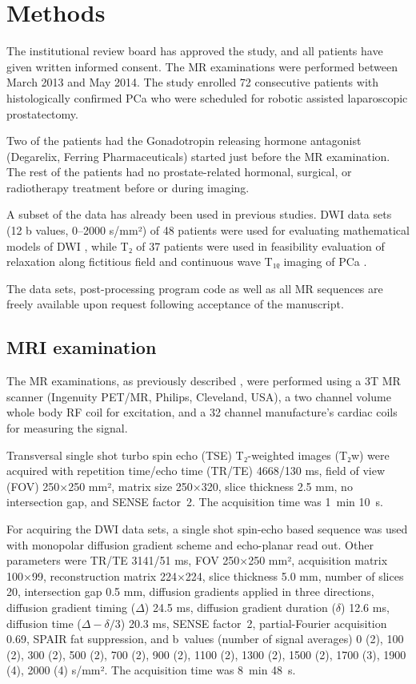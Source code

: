\section{Methods}

The institutional review board has approved the study, and all patients have
given written informed consent. The MR examinations were performed between March
2013 and May 2014. The study enrolled 72 consecutive patients with
histologically confirmed PCa who were scheduled for robotic assisted
laparoscopic prostatectomy.

Two of the patients had the Gonadotropin releasing hormone antagonist
(Degarelix, Ferring Pharmaceuticals) started just before the MR examination. The
rest of the patients had no prostate-related hormonal, surgical, or radiotherapy
treatment before or during imaging.

A subset of the data has already been used in previous studies. DWI data sets
(12 b values, 0--2000 s/mm²) of 48 patients were used for evaluating
mathematical models of DWI \citep{Toivonen2015, Jambor2015Relaxation,
Jambor2015Evaluation}, while T₂ of 37 patients were used in feasibility
evaluation of relaxation along fictitious field and continuous wave T₁ᵨ imaging
of PCa \citep{Jambor2015Relaxation, Jambor2015Rotating}.

The data sets, post-processing program code as well as all MR sequences are
freely available upon request following acceptance of the manuscript.


\subsection{MRI examination}

The MR examinations, as previously described \citep{Jambor2015Evaluation,
Toivonen2015, Jambor2015Relaxation}, were performed using a 3T MR scanner
(Ingenuity PET/MR, Philips, Cleveland, USA), a two channel volume whole body RF
coil for excitation, and a 32 channel manufacture's cardiac coils for measuring
the signal.

Transversal single shot turbo spin echo (TSE) T₂-weighted images (T₂w) were
acquired with repetition time/echo time (TR/TE) 4668/130 ms, field of view (FOV)
250×250 mm², matrix size 250×320, slice thickness 2.5 mm, no intersection gap,
and SENSE \citep{Pruessmann1999} factor~2. The acquisition time was 1~min 10~s.

For acquiring the DWI data sets, a single shot spin-echo based sequence was used
with monopolar diffusion gradient scheme and echo-planar read out. Other
parameters were TR/TE 3141/51 ms, FOV 250×250 mm², acquisition matrix 100×99,
reconstruction matrix 224×224, slice thickness 5.0 mm, number of slices 20,
intersection gap 0.5 mm, diffusion gradients applied in three directions,
diffusion gradient timing ($\Delta$) 24.5 ms, diffusion gradient duration
($\delta$) 12.6 ms, diffusion time ($\Delta-\delta/3$) 20.3 ms, SENSE
\citep{Pruessmann1999} factor~2, partial-Fourier acquisition 0.69, SPAIR fat
suppression, and b~values (number of signal averages) 0 (2), 100 (2), 300 (2),
500 (2), 700 (2), 900 (2), 1100 (2), 1300 (2), 1500 (2), 1700 (3), 1900 (4),
2000 (4) s/mm². The acquisition time was 8~min 48~s.

